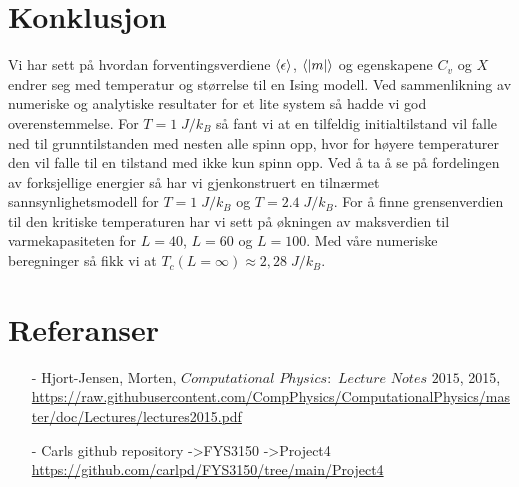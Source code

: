 \documentclass[reprint,english,notitlepage]{revtex4-2}  %
\begin{document}
\section{Konklusjon}

Vi har sett på hvordan forventingsverdiene $\expval{\epsilon}$, $\expval{|m|}$ og egenskapene $C_v$ og $X$ endrer seg med temperatur og størrelse til en Ising modell. Ved sammenlikning av numeriske og analytiske resultater for et lite system så hadde vi god overenstemmelse. For $T = 1 \; J/k_B$ så fant vi at en tilfeldig initialtilstand vil falle ned til grunntilstanden med nesten alle spinn opp, hvor for høyere temperaturer den vil falle til en tilstand med ikke kun spinn opp. Ved å ta å se på fordelingen av forksjellige energier så har vi gjenkonstruert en tilnærmet sannsynlighetsmodell for $T = 1 \; J/k_B$ og $T = 2.4 \; J/k_B$. For å finne grensenverdien til den kritiske temperaturen har vi sett på økningen av maksverdien til varmekapasiteten for $L = 40$, $L = 60$ og $L=100$. Med våre numeriske beregninger så fikk vi at $T_c \left (L = \infty \right ) \approx 2,28 \; J/k_B$.
\section*{Referanser}  %
\begin{itemize}
\item[-]Hjort-Jensen, Morten, $Computational$ $Physics:$ $Lecture$ $Notes$ $2015$, 2015, \url{https://raw.githubusercontent.com/CompPhysics/ComputationalPhysics/master/doc/Lectures/lectures2015.pdf}
\item[-] Carls github repository ->FYS3150 ->Project4 \url{https://github.com/carlpd/FYS3150/tree/main/Project4}
\end{itemize}
\newpage


\appendix
\end{document}
